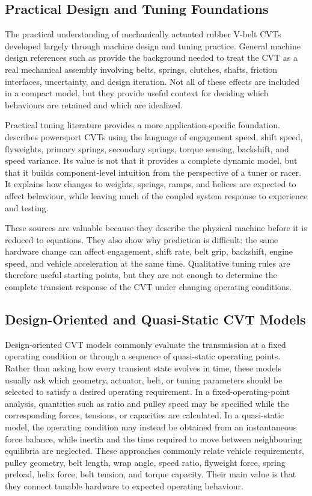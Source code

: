 \documentclass[11pt]{report}
\numberwithin{equation}{section}
\begin{document}
\subsection{Practical Design and Tuning Foundations}
\label{sec:lit-practical-design}

The practical understanding of mechanically actuated rubber V-belt CVTs developed largely through machine design and tuning practice. General machine design references such as \citet{BudynasNisbett2015} provide the background needed to treat the CVT as a real mechanical assembly involving belts, springs, clutches, shafts, friction interfaces, uncertainty, and design iteration. Not all of these effects are included in a compact model, but they provide useful context for deciding which behaviours are retained and which are idealized.

Practical tuning literature provides a more application-specific foundation. \citet{Aaen2007} describes powersport CVTs using the language of engagement speed, shift speed, flyweights, primary springs, secondary springs, torque sensing, backshift, and speed variance. Its value is not that it provides a complete dynamic model, but that it builds component-level intuition from the perspective of a tuner or racer. It explains how changes to weights, springs, ramps, and helices are expected to affect behaviour, while leaving much of the coupled system response to experience and testing.

These sources are valuable because they describe the physical machine before it is reduced to equations. They also show why prediction is difficult: the same hardware change can affect engagement, shift rate, belt grip, backshift, engine speed, and vehicle acceleration at the same time. Qualitative tuning rules are therefore useful starting points, but they are not enough to determine the complete transient response of the CVT under changing operating conditions.

\subsection{Design-Oriented and Quasi-Static CVT Models}
\label{sec:lit-design-models}

Design-oriented CVT models commonly evaluate the transmission at a fixed operating condition or through a sequence of quasi-static operating points. Rather than asking how every transient state evolves in time, these models usually ask which geometry, actuator, belt, or tuning parameters should be selected to satisfy a desired operating requirement. In a fixed-operating-point analysis, quantities such as ratio and pulley speed may be specified while the corresponding forces, tensions, or capacities are calculated. In a quasi-static model, the operating condition may instead be obtained from an instantaneous force balance, while inertia and the time required to move between neighbouring equilibria are neglected. These approaches commonly relate vehicle requirements, pulley geometry, belt length, wrap angle, speed ratio, flyweight force, spring preload, helix force, belt tension, and torque capacity. Their main value is that they connect tunable hardware to expected operating behaviour.
\end{document}
